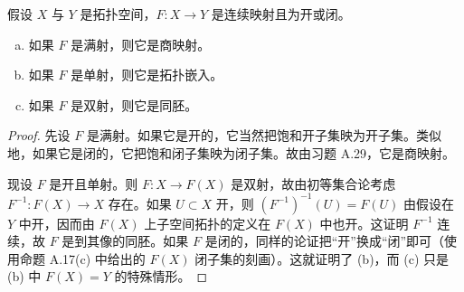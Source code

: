 \documentclass[../../main.tex]{subfiles}
\begin{document}
\begin{theorem}\label{theorem:appA-open-closed-maps}
假设 $X$ 与 $Y$ 是拓扑空间，$F:X\to Y$ 是连续映射且为开或闭。
\begin{enumerate}[(a)]
\item 如果 $F$ 是满射，则它是商映射。
\item 如果 $F$ 是单射，则它是拓扑嵌入。
\item 如果 $F$ 是双射，则它是同胚。
\end{enumerate}
\end{theorem}

\begin{proof}
先设 $F$ 是满射。如果它是开的，它当然把饱和开子集映为开子集。类似地，如果它是闭的，它把饱和闭子集映为闭子集。故由习题 A.29，它是商映射。

现设 $F$ 是开且单射。则 $F:X\to F(X)$ 是双射，故由初等集合论考虑 $F^{-1}:F(X)\to X$ 存在。如果 $U\subset X$ 开，则 $(F^{-1})^{-1}(U)=F(U)$ 由假设在 $Y$ 中开，因而由 $F(X)$ 上子空间拓扑的定义在 $F(X)$ 中也开。这证明 $F^{-1}$ 连续，故 $F$ 是到其像的同胚。如果 $F$ 是闭的，同样的论证把“开”换成“闭”即可（使用命题 A.17(c) 中给出的 $F(X)$ 闭子集的刻画）。这就证明了 (b)，而 (c) 只是 (b) 中 $F(X)=Y$ 的特殊情形。
\end{proof}
\end{document}
